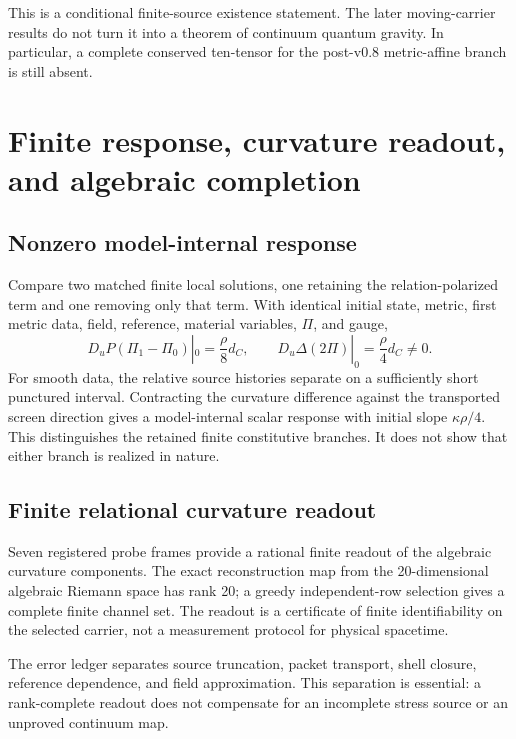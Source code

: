 \documentclass[12pt,a4paper,twoside]{article}
\begin{document}
This is a conditional finite-source existence statement. The later moving-carrier results do not turn it into a theorem of continuum quantum gravity. In particular, a complete conserved ten-tensor for the post-v0.8 metric-affine branch is still absent.

\section{Finite response, curvature readout, and algebraic completion}

\subsection{Nonzero model-internal response}

Compare two matched finite local solutions, one retaining the relation-polarized term and one removing only that term. With identical initial state, metric, first metric data, field, reference, material variables, $\Pi$, and gauge,
\begin{equation}
D_uP(\Pi_1-\Pi_0)|_0=\frac{\rho}{8}d_C,
\qquad
D_u\Delta(2\Pi)|_0=\frac{\rho}{4}d_C\neq0.
\end{equation}
For smooth data, the relative source histories separate on a sufficiently short punctured interval. Contracting the curvature difference against the transported screen direction gives a model-internal scalar response with initial slope $\kappa\rho/4$. This distinguishes the retained finite constitutive branches. It does not show that either branch is realized in nature.

\subsection{Finite relational curvature readout}

Seven registered probe frames provide a rational finite readout of the algebraic curvature components. The exact reconstruction map from the 20-dimensional algebraic Riemann space has rank 20; a greedy independent-row selection gives a complete finite channel set. The readout is a certificate of finite identifiability on the selected carrier, not a measurement protocol for physical spacetime.

The error ledger separates source truncation, packet transport, shell closure, reference dependence, and field approximation. This separation is essential: a rank-complete readout does not compensate for an incomplete stress source or an unproved continuum map.
\end{document}
